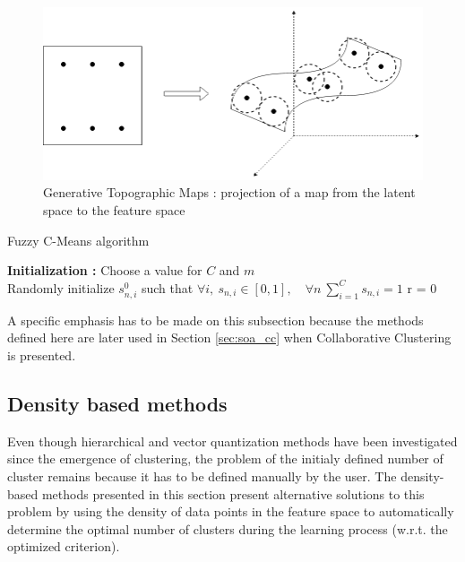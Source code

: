\documentclass[a4paper]{report}
\begin{document}
        \vspace{0.8cm}
   
        \begin{figure}[h]
            \centering
            \includegraphics[scale=.3]{gtm}
            \caption{Generative Topographic Maps : projection of a map from the latent space to the feature space}
            \label{fig:gtm}
        \end{figure}

    \begin{algorithm}
        \caption{Fuzzy C-Means algorithm}
        \label{alg:fcm}
        \textbf{Initialization :} Choose a value for $C$ and $m$\\
        Randomly initialize $s^0_{n,i}$ such that $\forall i, ~ s_{n,i} \in [0,1], \quad \forall n ~ \sum\limits_{i=1}^C s_{n,i} = 1$
        r = 0
    \end{algorithm}

    A specific emphasis has to be made on this subsection because the methods defined here are later used in Section \ref{sec:soa_cc} when Collaborative Clustering is presented.

    \subsection{Density based methods}

    Even though hierarchical and vector quantization methods have been investigated since the emergence of clustering, the problem of the initialy defined number of cluster remains because it has to be defined manually by the user. The density-based methods presented in this section present alternative solutions to this problem by using the density of data points in the feature space to automatically determine the optimal number of clusters during the learning process (w.r.t. the optimized criterion). 
\end{document}
